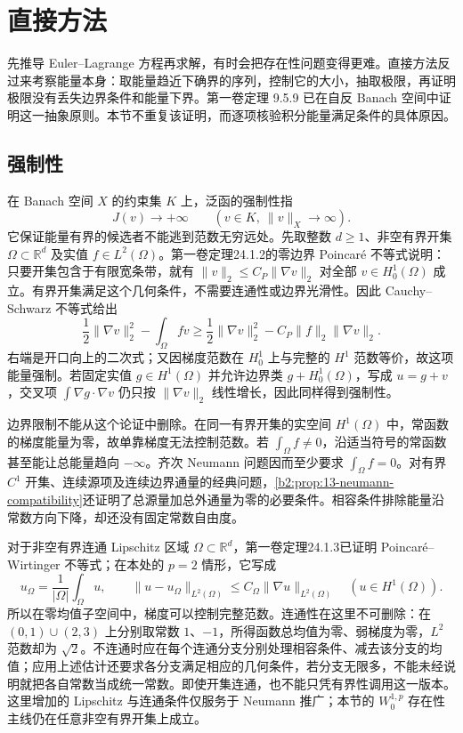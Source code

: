 \section{直接方法}
\label{b2:sec:1404}

先推导 Euler--Lagrange 方程再求解，有时会把存在性问题变得更难。直接方法反过来考察能量本身：取能量趋近下确界的序列，控制它的大小，抽取极限，再证明极限没有丢失边界条件和能量下界。第一卷定理 9.5.9 已在自反 Banach 空间中证明这一抽象原则。本节不重复该证明，而逐项核验积分能量满足条件的具体原因。

\subsection{强制性}
\label{b2:subsec:140401}

在 Banach 空间 \(X\) 的约束集 \(K\) 上，泛函的强制性指
\[J(v)\longrightarrow+\infty\qquad(v\in K,\ \lVert v\rVert_X\to\infty).\]
它保证能量有界的候选者不能逃到范数无穷远处。先取整数 \(d\geq1\)、非空有界开集 \(\Omega\subset\mathbb R^d\) 及实值 \(f\in L^2(\Omega)\)。第一卷定理24.1.2的零边界 Poincaré 不等式说明：只要开集包含于有限宽条带，就有 \(\|v\|_2\leq C_P\|\nabla v\|_2\) 对全部 \(v\in H_0^1(\Omega)\) 成立。有界开集满足这个几何条件，不需要连通性或边界光滑性。因此 Cauchy--Schwarz 不等式给出
\[
 \frac12\lVert\nabla v\rVert_2^2-\int_\Omega fv
 \ge\frac12\lVert\nabla v\rVert_2^2-C_P\lVert f\rVert_2\lVert\nabla v\rVert_2.
\]
右端是开口向上的二次式；又因梯度范数在 \(H_0^1\) 上与完整的 \(H^1\) 范数等价，故这项能量强制。若固定实值 \(g\in H^1(\Omega)\) 并允许边界类 \(g+H_0^1(\Omega)\)，写成 \(u=g+v\)，交叉项 \(\int\nabla g\cdot\nabla v\) 仍只按 \(\lVert\nabla v\rVert_2\) 线性增长，因此同样得到强制性。

\ProseParagraphBreak

边界限制不能从这个论证中删除。在同一有界开集的实空间 \(H^1(\Omega)\) 中，常函数的梯度能量为零，故单靠梯度无法控制范数。若 \(\int_\Omega f\ne0\)，沿适当符号的常函数甚至能让总能量趋向 \(-\infty\)。齐次 Neumann 问题因而至少要求 \(\int_\Omega f=0\)。对有界 \(C^1\) 开集、连续源项及连续边界通量的经典问题，\cref{b2:prop:13-neumann-compatibility}还证明了总源量加总外通量为零的必要条件。相容条件排除能量沿常数方向下降，却还没有固定常数自由度。

\ProseParagraphBreak

对于非空有界连通 Lipschitz 区域 \(\Omega\subset\mathbb R^d\)，第一卷定理24.1.3已证明 Poincaré--Wirtinger 不等式；在本处的 \(p=2\) 情形，它写成
\[
 u_\Omega=\frac1{|\Omega|}\int_\Omega u,\qquad
 \|u-u_\Omega\|_{L^2(\Omega)}
 \leq C_\Omega\|\nabla u\|_{L^2(\Omega)}
 \quad(u\in H^1(\Omega)).
\]
所以在零均值子空间中，梯度可以控制完整范数。连通性在这里不可删除：在 \((0,1)\cup(2,3)\) 上分别取常数 \(1\)、\(-1\)，所得函数总均值为零、弱梯度为零，\(L^2\) 范数却为 \(\sqrt2\)。不连通时应在每个连通分支分别处理相容条件、减去该分支的均值；应用上述估计还要求各分支满足相应的几何条件，若分支无限多，不能未经说明就把各自常数当成统一常数。即使开集连通，也不能只凭有界性调用这一版本。这里增加的 Lipschitz 与连通条件仅服务于 Neumann 推广；本节的 \(W_0^{1,p}\) 存在性主线仍在任意非空有界开集上成立。

